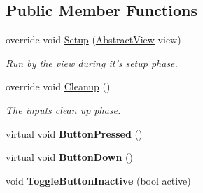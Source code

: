\subsection*{Public Member Functions}
\begin{DoxyCompactItemize}
\item 
override void \hyperlink{class_scaffolding_1_1_abstract_button_aa9ef22706bd2af0de02ec86f4d6641d4}{Setup} (\hyperlink{class_scaffolding_1_1_abstract_view}{Abstract\+View} view)
\begin{DoxyCompactList}\small\item\em Run by the view during it's setup phase. \end{DoxyCompactList}\item 
override void \hyperlink{class_scaffolding_1_1_abstract_button_ae8879dc8ec6de80c1c75d7399ebffe90}{Cleanup} ()
\begin{DoxyCompactList}\small\item\em The inputs clean up phase. \end{DoxyCompactList}\item 
\hypertarget{class_scaffolding_1_1_abstract_button_a8ba5b844a0a9af02bb60aefc4a6f8a6f}{virtual void {\bfseries Button\+Pressed} ()}\label{class_scaffolding_1_1_abstract_button_a8ba5b844a0a9af02bb60aefc4a6f8a6f}

\item 
\hypertarget{class_scaffolding_1_1_abstract_button_ae6dddf72812ac62282f3cde509f6b43b}{virtual void {\bfseries Button\+Down} ()}\label{class_scaffolding_1_1_abstract_button_ae6dddf72812ac62282f3cde509f6b43b}

\item 
\hypertarget{class_scaffolding_1_1_abstract_button_a672ed0b6c81579cd2daaa7c0274bcdb0}{void {\bfseries Toggle\+Button\+Inactive} (bool active)}\label{class_scaffolding_1_1_abstract_button_a672ed0b6c81579cd2daaa7c0274bcdb0}


\end{DoxyCompactItemize}

